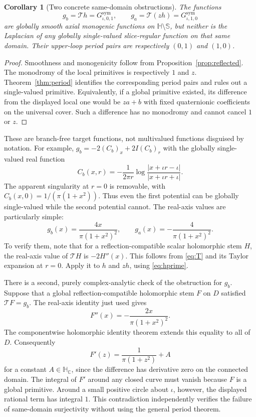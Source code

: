 \documentclass[11pt,a4paper]{article}
\numberwithin{equation}{section}
\newtheorem{corollary}[theorem]{Corollary}
\theoremstyle{definition}
\theoremstyle{remark}
\newcommand{\C}{\mathbb C}
\newcommand{\HH}{\mathbb H}
\newcommand{\HC}{\mathbb H_{\C}}
\newcommand{\SSS}{\mathbb S}
\newcommand{\T}{\mathcal T}
\begin{document}
\begin{corollary}[Two concrete same-domain obstructions]
\label{cor:counterexample}
The functions
\[
 g_b=\T h=G^{\mathrm{sym}}_{\iota,0,1},\qquad
 g_a=\T(zh)=G^{\mathrm{sym}}_{\iota,1,0}
\]
are globally smooth axial monogenic functions on $\HH\setminus\SSS$,
but neither is the Laplacian of any globally single-valued slice-regular
function on that same domain. Their upper-loop period pairs are respectively
$(0,1)$ and $(1,0)$.
\end{corollary}
\begin{proof}
Smoothness and monogenicity follow from Proposition~\ref{prop:reflected}.
The monodromy of the local primitives is respectively $1$ and $z$.
Theorem~\ref{thm:period} identifies the corresponding period pairs and
rules out a single-valued primitive. Equivalently, if a global primitive
existed, its difference from the displayed local one would be $za+b$ with
fixed quaternionic coefficients on the universal cover. Such a difference
has no monodromy and cannot cancel $1$ or $z$.
\end{proof}

These are branch-free target functions, not multivalued functions disguised
by notation. For example, $g_b=-2(C_b)_x+2I(C_b)_r$ with the globally
single-valued real function
\begin{equation}
 C_b(x,r)=-\frac1{2\pi r}
       \log\frac{|x+\iota r-\iota|}{|x+\iota r+\iota|}.
 \label{eq:Cb}
\end{equation}
The apparent singularity at $r=0$ is removable, with
$C_b(x,0)=1/(\pi(1+x^2))$. Thus even the first potential can be globally
single-valued while the second potential cannot. The real-axis values are
particularly simple:
\begin{equation}
 g_b(x)=\frac{4x}{\pi(1+x^2)^2},\qquad
 g_a(x)=-\frac4{\pi(1+x^2)^2}.
 \label{eq:realtraces}
\end{equation}
To verify them, note that for a reflection-compatible scalar holomorphic
stem $H$, the real-axis value of $\T H$ is $-2H''(x)$. This follows from
\eqref{eq:T} and its Taylor expansion at $r=0$. Apply it to $h$ and $zh$,
using \eqref{eq:hprime}.

There is a second, purely complex-analytic check of the obstruction for
$g_b$. Suppose that a global reflection-compatible holomorphic stem $F$ on
$D$ satisfied $\T F=g_b$. The real-axis identity just used gives
\[
 F''(x)=-\frac{2x}{\pi(1+x^2)^2}.
\]
The componentwise holomorphic identity theorem extends this equality to
all of $D$. Consequently
\[
 F'(z)=\frac1{\pi(1+z^2)}+A
\]
for a constant $A\in\HC$, since the difference has derivative zero on
the connected domain. The integral of $F'$ around any closed curve must
vanish because $F$ is a global primitive. Around a small positive circle
about $\iota$, however, the displayed rational term has integral $1$.
This contradiction independently verifies the failure of same-domain
surjectivity without using the general period theorem.
\end{document}
